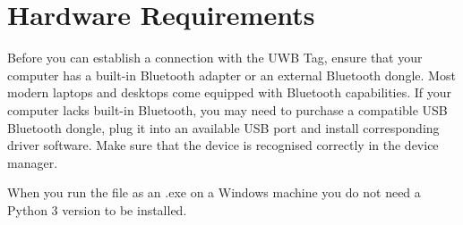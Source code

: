 \chapter{Hardware Requirements}

Before you can establish a connection with the UWB Tag, ensure that your computer has a built-in Bluetooth adapter or an external Bluetooth dongle. Most modern laptops and desktops come equipped with Bluetooth capabilities. If your computer lacks built-in Bluetooth, you may need to purchase a compatible USB Bluetooth dongle, plug it into an available USB port and install corresponding driver software. 
Make sure that the device is recognised correctly in the device manager. 

When you run the file as an .exe on a Windows machine you do not need a Python 3 version to be installed. 